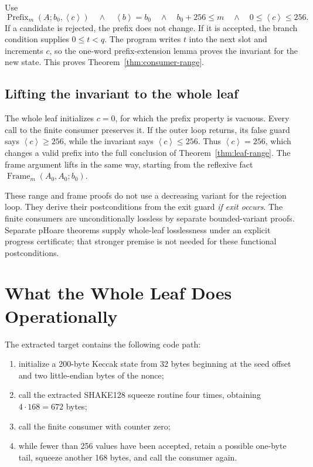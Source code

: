 \documentclass[11pt]{article}
\theoremstyle{definition}
\theoremstyle{plain}
\theoremstyle{remark}
\newcommand{\uint}[1]{\left\langle #1\right\rangle}
\newcommand{\Frame}{\operatorname{Frame}}
\newcommand{\Prefix}{\operatorname{Prefix}}
\begin{document}
Use
\[
  \Prefix_m(A;b_0,\uint{c})
  \quad\land\quad
  \uint{b}=b_0
  \quad\land\quad
  b_0+256\le m
  \quad\land\quad
  0\le\uint{c}\le256.
\]
If a candidate is rejected, the prefix does not change.  If it is accepted,
the branch condition supplies $0\le t<q$.  The program writes $t$ into the
next slot and increments $c$, so the one-word prefix-extension lemma proves
the invariant for the new state.  This proves
Theorem~\ref{thm:consumer-range}.

\subsection{Lifting the invariant to the whole leaf}

The whole leaf initializes $c=0$, for which the prefix property is vacuous.
Every call to the finite consumer preserves it.  If the outer loop returns,
its false guard says $\uint{c}\ge256$, while the invariant says
$\uint{c}\le256$.  Thus $\uint{c}=256$, which changes a valid prefix into the
full conclusion of Theorem~\ref{thm:leaf-range}.  The frame argument lifts in
the same way, starting from the reflexive fact
$\Frame_m(A_0,A_0;b_0)$.

These range and frame proofs do not use a decreasing variant for the rejection
loop.  They derive their postconditions from the exit guard \emph{if exit
occurs}.  The finite consumers are unconditionally lossless by separate
bounded-variant proofs.  Separate pHoare theorems supply whole-leaf
losslessness under an explicit progress certificate; that stronger premise is
not needed for these functional postconditions.

\section{What the Whole Leaf Does Operationally}

The extracted target contains the following code path:
\begin{enumerate}
\item initialize a 200-byte Keccak state from 32 bytes beginning at the seed
  offset and two little-endian bytes of the nonce;
\item call the extracted SHAKE128 squeeze routine four times, obtaining
  $4\cdot168=672$ bytes;
\item call the finite consumer with counter zero;
\item while fewer than 256 values have been accepted, retain a possible
  one-byte tail, squeeze another 168 bytes, and call the consumer again.
\end{enumerate}
\end{document}
